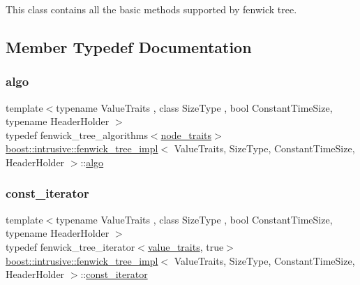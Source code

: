This class contains all the basic methods supported by fenwick tree. 

\subsection{Member Typedef Documentation}
\mbox{\label{classboost_1_1intrusive_1_1fenwick__tree__impl_afd6f10ecfa8d7232152bc249cc61d246}} 
\subsubsection{\texorpdfstring{algo}{algo}}
{\footnotesize\ttfamily template$<$typename Value\+Traits , class Size\+Type , bool Constant\+Time\+Size, typename Header\+Holder $>$ \\
typedef fenwick\+\_\+tree\+\_\+algorithms$<$\hyperlink{classboost_1_1intrusive_1_1fenwick__tree__impl_a6b28754cf23051d44f0caae912a22b04}{node\+\_\+traits}$>$ \hyperlink{classboost_1_1intrusive_1_1fenwick__tree__impl}{boost\+::intrusive\+::fenwick\+\_\+tree\+\_\+impl}$<$ Value\+Traits, Size\+Type, Constant\+Time\+Size, Header\+Holder $>$\+::\hyperlink{classboost_1_1intrusive_1_1fenwick__tree__impl_afd6f10ecfa8d7232152bc249cc61d246}{algo}}

\mbox{\label{classboost_1_1intrusive_1_1fenwick__tree__impl_a54559dc10b4a93114b1048ad9e41b5f1}} 
\subsubsection{\texorpdfstring{const\+\_\+iterator}{const\_iterator}}
{\footnotesize\ttfamily template$<$typename Value\+Traits , class Size\+Type , bool Constant\+Time\+Size, typename Header\+Holder $>$ \\
typedef fenwick\+\_\+tree\+\_\+iterator$<$\hyperlink{classboost_1_1intrusive_1_1fenwick__tree__impl_a2e87a9b3164c911991b62a4405bdca5f}{value\+\_\+traits}, true$>$ \hyperlink{classboost_1_1intrusive_1_1fenwick__tree__impl}{boost\+::intrusive\+::fenwick\+\_\+tree\+\_\+impl}$<$ Value\+Traits, Size\+Type, Constant\+Time\+Size, Header\+Holder $>$\+::\hyperlink{classboost_1_1intrusive_1_1fenwick__tree__impl_a54559dc10b4a93114b1048ad9e41b5f1}{const\+\_\+iterator}}

